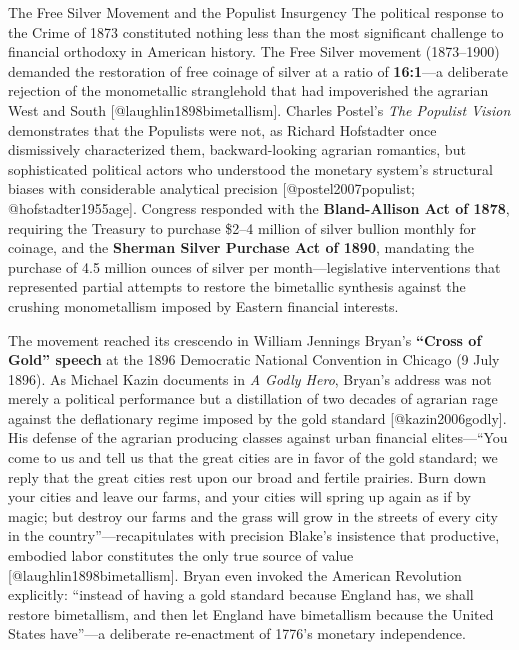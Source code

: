 \documentclass[
  ignorenonframetext,
]{beamer}
\begin{document}
\begin{frame}{The Free Silver Movement and the Populist Insurgency}
\protect{}\label{the-free-silver-movement-and-the-populist-insurgency}
The political response to the Crime of 1873 constituted nothing less
than the most significant challenge to financial orthodoxy in American
history. The Free Silver movement (1873--1900) demanded the restoration
of free coinage of silver at a ratio of \textbf{16:1}---a deliberate
rejection of the monometallic stranglehold that had impoverished the
agrarian West and South {[}@laughlin1898bimetallism{]}. Charles Postel's
\emph{The Populist Vision} demonstrates that the Populists were not, as
Richard Hofstadter once dismissively characterized them,
backward-looking agrarian romantics, but sophisticated political actors
who understood the monetary system's structural biases with considerable
analytical precision {[}@postel2007populist; @hofstadter1955age{]}.
Congress responded with the \textbf{Bland-Allison Act of 1878},
requiring the Treasury to purchase \$2--4 million of silver bullion
monthly for coinage, and the \textbf{Sherman Silver Purchase Act of
1890}, mandating the purchase of 4.5 million ounces of silver per
month---legislative interventions that represented partial attempts to
restore the bimetallic synthesis against the crushing monometallism
imposed by Eastern financial interests.

The movement reached its crescendo in William Jennings Bryan's
\textbf{``Cross of Gold'' speech} at the 1896 Democratic National
Convention in Chicago (9 July 1896). As Michael Kazin documents in
\emph{A Godly Hero}, Bryan's address was not merely a political
performance but a distillation of two decades of agrarian rage against
the deflationary regime imposed by the gold standard
{[}@kazin2006godly{]}. His defense of the agrarian producing classes
against urban financial elites---``You come to us and tell us that the
great cities are in favor of the gold standard; we reply that the great
cities rest upon our broad and fertile prairies. Burn down your cities
and leave our farms, and your cities will spring up again as if by
magic; but destroy our farms and the grass will grow in the streets of
every city in the country''---recapitulates with precision Blake's
insistence that productive, embodied labor constitutes the only true
source of value {[}@laughlin1898bimetallism{]}. Bryan even invoked the
American Revolution explicitly: ``instead of having a gold standard
because England has, we shall restore bimetallism, and then let England
have bimetallism because the United States have''---a deliberate
re-enactment of 1776's monetary independence.


\end{frame}
\end{document}

